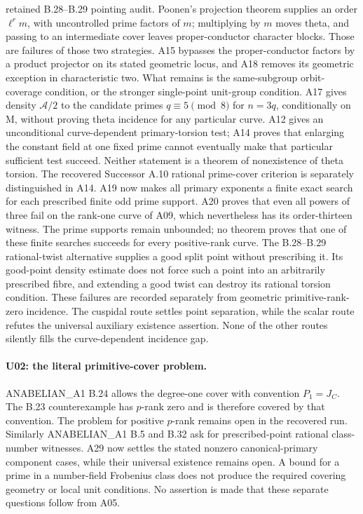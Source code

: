 retained B.28--B.29 pointing audit. Poonen's
projection theorem supplies an order $\ell^r m$, with uncontrolled
prime factors of $m$; multiplying by $m$ moves theta, and passing to
an intermediate cover leaves proper-conductor character blocks.
Those are failures of those two strategies. A15 bypasses the
proper-conductor factors by a product projector on its stated
geometric locus, and A18 removes its geometric exception in
characteristic two. What remains is the same-subgroup orbit-coverage
condition, or the stronger single-point unit-group condition.
A17 gives density $\mathcal A/2$ to the candidate primes
$q\equiv5\pmod8$ for $n=3q$, conditionally on M, without proving
theta incidence for any particular curve. A12 gives an unconditional
curve-dependent primary-torsion test; A14 proves that enlarging the
constant field at one fixed prime cannot eventually make that
particular sufficient test succeed. Neither statement is a theorem
of nonexistence of theta torsion. The recovered Successor A.10
rational prime-cover criterion is separately distinguished in A14.
A19 now makes all primary exponents a finite exact search for
each prescribed finite odd prime support. A20 proves that even
all powers of three fail on the rank-one curve of A09, which
nevertheless has its order-thirteen witness. The prime supports
remain unbounded; no theorem proves that one of these finite
searches succeeds for every positive-rank curve.
The B.28--B.29 rational-twist alternative supplies a good split
point without prescribing it. Its good-point density estimate
does not force such a point into an arbitrarily prescribed fibre,
and extending a good twist can destroy its rational torsion
condition. These failures are recorded separately from geometric
primitive-rank-zero incidence.
The cuspidal route
settles point separation, while the scalar route refutes the
universal auxiliary existence assertion. None of the other routes
silently fills the curve-dependent incidence gap.

\paragraph{U02: the literal primitive-cover problem.}
ANABELIAN\_A1 B.24 allows the degree-one cover with convention
$P_1=J_C$. The B.23 counterexample has $p$-rank zero and is therefore
covered by that convention. The problem for positive $p$-rank
remains open in the recovered run. Similarly ANABELIAN\_A1 B.5 and
B.32 ask for prescribed-point rational class-number witnesses. A29
now settles the stated nonzero canonical-primary component cases,
while their universal existence remains open.
A bound for a prime in a number-field Frobenius class does not
produce the required covering geometry or local unit conditions.
No assertion is made that these separate questions follow from A05.

